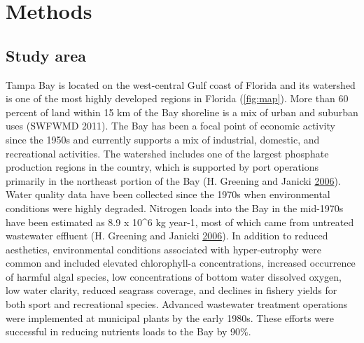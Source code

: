 \documentclass[]{article}
\begin{document}
\section{Methods}\label{methods}

\subsection{Study area}\label{study-area}

Tampa Bay is located on the west-central Gulf coast of Florida and its
watershed is one of the most highly developed regions in Florida
(\cref{fig:map}). More than 60 percent of land within 15 km of the Bay
shoreline is a mix of urban and suburban uses (SWFWMD 2011). The Bay has
been a focal point of economic activity since the 1950s and currently
supports a mix of industrial, domestic, and recreational activities. The
watershed includes one of the largest phosphate production regions in
the country, which is supported by port operations primarily in the
northeast portion of the Bay (H. Greening and Janicki
\protect\hyperlink{ref-Greening06}{2006}). Water quality data have been
collected since the 1970s when environmental conditions were highly
degraded. Nitrogen loads into the Bay in the mid-1970s have been
estimated as 8.9 x 10\^{}6 kg year-1, most of which came from untreated
wastewater effluent (H. Greening and Janicki
\protect\hyperlink{ref-Greening06}{2006}). In addition to reduced
aesthetics, environmental conditions associated with hyper-eutrophy were
common and included elevated chlorophyll-a concentrations, increased
occurrence of harmful algal species, low concentrations of bottom water
dissolved oxygen, low water clarity, reduced seagrass coverage, and
declines in fishery yields for both sport and recreational species.
Advanced wastewater treatment operations were implemented at municipal
plants by the early 1980s. These efforts were successful in reducing
nutrients loads to the Bay by 90\%.
\end{document}
